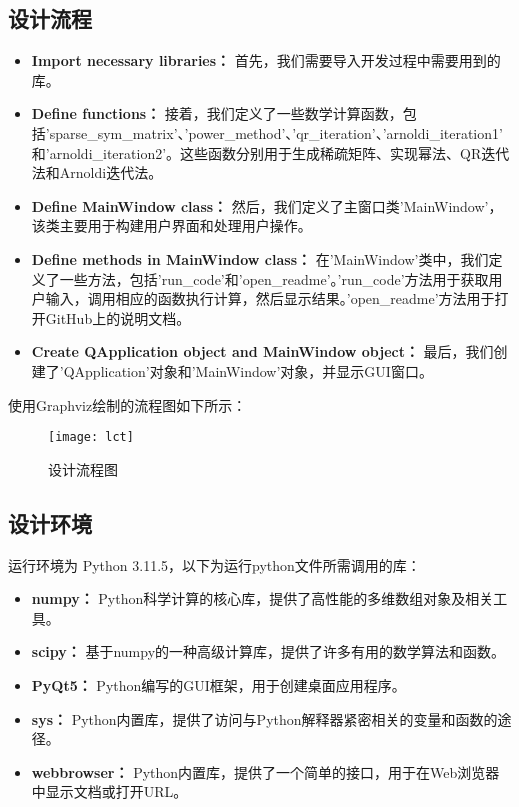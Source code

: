 \documentclass{source/Report}
\begin{document}
\subsection{设计流程}
\begin{itemize}
  \item \textbf{Import necessary libraries：} 首先，我们需要导入开发过程中需要用到的库。
  \item \textbf{Define functions：} 接着，我们定义了一些数学计算函数，包括'sparse\_sym\_matrix'、'power\_method'、'qr\_iteration'、'arnoldi\_iteration1'和'arnoldi\_iteration2'。这些函数分别用于生成稀疏矩阵、实现幂法、QR迭代法和Arnoldi迭代法。
  \item \textbf{Define MainWindow class：} 然后，我们定义了主窗口类'MainWindow'，该类主要用于构建用户界面和处理用户操作。
  \item \textbf{Define methods in MainWindow class：} 在'MainWindow'类中，我们定义了一些方法，包括'run\_code'和'open\_readme'。'run\_code'方法用于获取用户输入，调用相应的函数执行计算，然后显示结果。'open\_readme'方法用于打开GitHub上的说明文档。
  \item \textbf{Create QApplication object and MainWindow object：} 最后，我们创建了'QApplication'对象和'MainWindow'对象，并显示GUI窗口。
\end{itemize}

使用Graphviz绘制的流程图如下所示：
\begin{figure}[H]
  \centering
  \texttt{[image: lct]}
  \caption{设计流程图}
\end{figure}

\subsection{设计环境}
运行环境为 Python 3.11.5，以下为运行python文件所需调用的库：
\begin{itemize}
  \item \textbf{numpy：} Python科学计算的核心库，提供了高性能的多维数组对象及相关工具。
  \item \textbf{scipy：} 基于numpy的一种高级计算库，提供了许多有用的数学算法和函数。
  \item \textbf{PyQt5：} Python编写的GUI框架，用于创建桌面应用程序。
  \item \textbf{sys：} Python内置库，提供了访问与Python解释器紧密相关的变量和函数的途径。
  \item \textbf{webbrowser：} Python内置库，提供了一个简单的接口，用于在Web浏览器中显示文档或打开URL。
\end{itemize}
\end{document}
